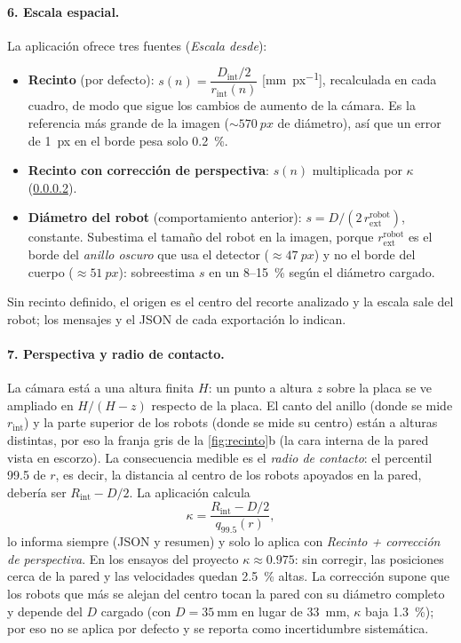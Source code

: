 \paragraph{6. Escala espacial.} La aplicación ofrece tres fuentes (\emph{Escala desde}):
\begin{itemize}
  \item \textbf{Recinto} (por defecto): $s(n) = \dfrac{D_{\mathrm{int}}/2}{r_{\mathrm{int}}(n)}$
        [\si{\milli\metre\per px}], recalculada en cada cuadro, de modo que sigue los cambios de
        aumento de la cámara. Es la referencia más grande de la imagen ($\sim\SI{570}{px}$ de diámetro),
        así que un error de \SI{1}{px} en el borde pesa solo \SI{0.2}{\percent}.
  \item \textbf{Recinto con corrección de perspectiva}: $s(n)$ multiplicada por $\kappa$
        (\cref{sec:perspectiva}).
  \item \textbf{Diámetro del robot} (comportamiento anterior): $s = D/(2\,r_{\mathrm{ext}}^{\mathrm{robot}})$,
        constante. Subestima el tamaño del robot en la imagen, porque $r_{\mathrm{ext}}^{\mathrm{robot}}$ es el
        borde del \emph{anillo oscuro} que usa el detector ($\approx\SI{47}{px}$) y no el borde del cuerpo
        ($\approx\SI{51}{px}$): sobreestima $s$ en un \num{8}--\SI{15}{\percent} según el diámetro cargado.
\end{itemize}
Sin recinto definido, el origen es el centro del recorte analizado y la escala sale del robot; los
mensajes y el JSON de cada exportación lo indican.

\paragraph{7. Perspectiva y radio de contacto.}\label{sec:perspectiva} La cámara está a una altura
finita $H$: un punto a altura $z$ sobre la placa se ve ampliado en $H/(H-z)$ respecto de la placa. El
canto del anillo (donde se mide $r_{\mathrm{int}}$) y la parte superior de los robots (donde se mide su
centro) están a alturas distintas, por eso la franja gris de la \cref{fig:recinto}b (la cara interna de
la pared vista en escorzo). La consecuencia medible es el \emph{radio de contacto}: el percentil
\num{99.5} de $r$, es decir, la distancia al centro de los robots apoyados en la pared, debería ser
$R_{\mathrm{int}} - D/2$. La aplicación calcula
\begin{equation}
  \kappa = \frac{R_{\mathrm{int}} - D/2}{q_{99.5}(r)},
\end{equation}
lo informa siempre (JSON y resumen) y solo lo aplica con \emph{Recinto + corrección de perspectiva}.
En los ensayos del proyecto $\kappa \approx \num{0.975}$: sin corregir, las posiciones cerca de la pared
y las velocidades quedan \SI{2.5}{\percent} altas. La corrección supone que los robots que más se
alejan del centro tocan la pared con su diámetro completo y depende del $D$ cargado (con
$D = \SI{35}{\milli\metre}$ en lugar de \SI{33}{\milli\metre}, $\kappa$ baja \SI{1.3}{\percent}); por
eso no se aplica por defecto y se reporta como incertidumbre sistemática.

